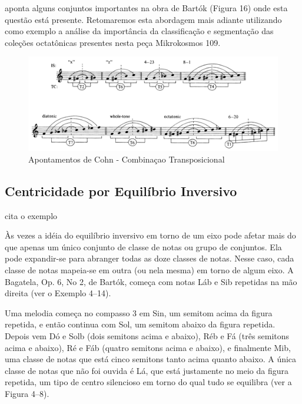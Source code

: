 \documentclass[
	12pt,				%
	openright,			%
	twoside,			%
	a4paper,			%
	english,			%
	french,				%
	spanish,			%
	brazil				%
	]{abntex2}
\begin{document}
 aponta alguns conjuntos importantes na obra de Bartók (Figura 16) onde esta questão está presente. Retomaremos esta abordagem mais adiante utilizando como exemplo a análise da importância da classificação e segmentação das coleções octatônicas presentes nesta peça Mikrokosmos 109.\cite{cohn1991bartok}

\begin{figure}[!h]
	\caption{\label{fig_grafico}Apontamentos de Cohn - Combinaçao Transposicional}
	\begin{center}
	    \includegraphics[scale=0.4]{axis/TCCohn.png}
	\end{center}
\end{figure}



\subsection{Centricidade por Equilíbrio Inversivo}

 cita o exemplo

Às vezes a idéia do equilíbrio inversivo em torno de um eixo pode afetar mais do que
apenas um único conjunto de classe de notas ou grupo de conjuntos. Ela pode expandir-se
para abranger todas as doze classes de notas. Nesse caso, cada classe de notas mapeia-se
em outra (ou nela mesma) em torno de algum eixo. A Bagatela, Op. 6, No 2, de Bartók,
começa com notas Láb e Sib repetidas na mão direita (ver o Exemplo 4–14).

Uma melodia começa no compasso 3 em Sin, um semitom acima da figura repetida, e
então continua com Sol, um semitom abaixo da figura repetida. Depois vem Dó e Solb
(dois semitons acima e abaixo), Réb e Fá (três semitons acima e abaixo), Ré e Fáb (quatro
semitons acima e abaixo), e finalmente Mib, uma classe de notas que está cinco semitons
tanto acima quanto abaixo. A única classe de notas que não foi ouvida é Lá, que está
justamente no meio da figura repetida, um tipo de centro silencioso em torno do qual tudo
se equilibra (ver a Figura 4–8).
\cite[ p.121]{straus2004}
\end{document}
